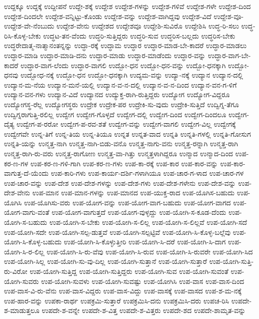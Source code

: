 {ಉದ್ದಕ್ಕೂ
ಉದ್ದಕ್ಕೆ
ಉದ್ದೀಪನೆ
ಉದ್ದೇ-ಶಕ್ಕೆ
ಉದ್ದೇಶ
ಉದ್ದೇಶ-ಗಳನ್ನು
ಉದ್ದೇಶ-ಗಳಿವೆ
ಉದ್ದೇಶ-ಗಳೇ
ಉದ್ದೇಶ-ದಿಂದ
ಉದ್ದೇಶ-ದಿಂದಲೇ
ಉದ್ದೇಶ-ವನ್ನಿಟ್ಟು-ಕೊಂಡು
ಉದ್ದೇಶ-ವನ್ನು
ಉದ್ದೇಶ-ವಾಗಿದ್ದವು
ಉದ್ದೇಶ-ವಿದೆ
ಉದ್ದೇಶ-ವೂ-
ಉದ್ದೇಶ-ವೇ-ನೆಂಬುದು
ಉದ್ದೇಶ-ವೇನು
ಉದ್ದೇಶದ
ಉದ್ದೇಶವೂ
ಉದ್ದೇಶಿ-ಸುವಿರೊ
ಉದ್ದೇಶಿಸಿ
ಉದ್ಧ-ರಿ-ಸಲು
ಉದ್ಧ-ರಿಸಿ-ಕೊಳ್ಳ-ಬೇಕು
ಉದ್ಧಟ-ತನ-ವೆಂದು
ಉದ್ಧರಿ-ಸುತ್ತಿದ್ದರು
ಉದ್ಧರಿ-ಸುವ
ಉದ್ಧರಿಸ-ಬಲ್ಲದು
ಉದ್ಧರಿಸ-ಬೇಕು
ಉದ್ಧರೇದಾತ್ಮ-ನಾತ್ಮಾನಂತನ್ನನ್ನು
ಉದ್ಧಾ-ರಕ್ಕೆ
ಉದ್ಧಾಮ
ಉದ್ಧಾರ
ಉದ್ಧಾರ-ಮಾಡ-ಬೇ-ಕಾದರೆ
ಉದ್ಧಾರ-ಮಾಡಲು
ಉದ್ಧಾರ-ಮಾಡಿ
ಉದ್ಧಾರ-ಮಾಡಿ-ದನು
ಉದ್ಧಾರ-ಮಾಡು
ಉದ್ಧಾರ-ಮಾಡೆಂದು
ಉದ್ಧಾರ-ವನ್ನು
ಉದ್ಧಾರ-ವಾಗ-ಬೇ-ಕಾದರೆ
ಉದ್ಧಾರ-ವಾಗ-ಲೆಂದು
ಉದ್ಧಾರ-ವಾಗಲಿ
ಉದ್ಬೋ-ಧನ
ಉದ್ಬೋ-ಧನ-ವನ್ನು
ಉದ್ಬೋ-ಧನಕ್ಕಾಗಿ
ಉದ್ಬೋ-ಧನವು
ಉದ್ಬೋಧ-ನಕ್ಕೆ
ಉದ್ಭೋ-ಧನ
ಉದ್ಭೋ-ಧನಕ್ಕಾಗಿ
ಉದ್ಯಮ-ವನ್ನು
ಉದ್ಯಾ-ನಕ್ಕೆ
ಉದ್ಯಾನ
ಉದ್ಯಾನ-ದಲ್ಲಿ
ಉದ್ಯಾನ-ಮ-ನೆಯ
ಉದ್ಯಾನ-ಮನೆ-ಯಲ್ಲಿ
ಉದ್ಯಾನ-ವ-ನ-ದಲ್ಲಿ
ಉದ್ಯಾನ-ವ-ನ-ದಿಂದ
ಉದ್ಯಾನ-ವನ-ಗ-ಳಿಗೆ
ಉದ್ಯಾನ-ವನ-ಗಳು
ಉದ್ಯಾನ-ವಿದೆ
ಉದ್ಯಾನದ
ಉದ್ಯುಕ್ತ-ರಾಗಿ-ರುತ್ತಿದ್ದರು
ಉದ್ಯೋಗ
ಉದ್ಯೋಗ-ವಿದ್ದರೂ
ಉದ್ಯೋಗಸ್ಥ-ರೆಲ್ಲ
ಉದ್ಯೋಗಸ್ಥರು
ಉದ್ರೇಕ
ಉದ್ರೇಕ-ಪರ
ಉದ್ರೇಕಿ-ಸು-ವುದು
ಉದ್ರೇಕಿ-ಸುತ್ತಿದೆ
ಉದ್ವಿಗ್ನ-ತೆಗೂ
ಉದ್ವಿಗ್ನರಾಗುತ್ತಿ-ರಲಿಲ್ಲ
ಉದ್ವೇಗ
ಉದ್ವೇಗ-ಗೊಳ್ಳದೆ
ಉದ್ವೇಗ-ದಲ್ಲಿ
ಉದ್ವೇಗ-ದಿಂದ
ಉದ್ವೇಗ-ದಿಂದಲೂ
ಉದ್ವೇಗ-ದೈತ್ಯ
ಉದ್ವೇಗ-ಪ-ರರೋ
ಉದ್ವೇಗ-ಪ-ರವ-ಶತೆ
ಉದ್ವೇಗ-ವನ್ನು
ಉದ್ವೇಗ-ವಾಗಲಿ
ಉದ್ವೇಗ-ವಿಲ್ಲ
ಉದ್ವೇಗಕ್ಕೆ
ಉದ್ವೇಗವೇ
ಉನ್ನ-ತಿಗೆ
ಉನ್ನ-ತಿಯ
ಉನ್ನ-ತಿಯೂ
ಉನ್ನತ
ಉನ್ನತ-ವಾದ
ಉನ್ನತಿ
ಉನ್ನತಿ-ಗಳಲ್ಲಿ
ಉನ್ನತಿ-ಗೋಸುಗ
ಉನ್ನತಿ-ಯನ್ನು
ಉನ್ಮತ್ತ-ನಾಗಿ
ಉನ್ಮತ್ತ-ನಾಗಿ-ಬಿಡು-ವನೊ
ಉನ್ಮತ್ತ-ನಾಗು-ವನು
ಉನ್ಮತ್ತ-ರನ್ನಾಗಿ
ಉನ್ಮತ್ತ-ರಾಗಿ
ಉನ್ಮತ್ತ-ರಾಗಿ-ರು-ವರು
ಉನ್ಮತ್ತ-ರಾಗೋಣ
ಉನ್ಮತ್ತ-ವಾ-ಗಿತ್ತು
ಉನ್ಮತ್ತಳಾಗಿದ್ದರೂ
ಉನ್ಮಾದ
ಉನ್ಮಾದ-ದಿಂದ
ಉಪ-ಕರ-ಣ-ಗಳ
ಉಪ-ಕರ-ಣ-ಗಳಿ-ಗಾಗಿ
ಉಪ-ಕರ-ಣ-ಗಳು
ಉಪ-ಕಾ-ರಕ್ಕೆ
ಉಪ-ಕಾರ
ಉಪ-ಕಾರ-ವನ್ನು
ಉಪ-ಕಾರ-ವಾಗುತ್ತ-ದೆ-ಯೆಂದು
ಉಪ-ಕಾರಿ-ಗಳು
ಉಪ-ಕಾರ್ಯ-ದರ್ಶಿ-ಗಳಾಗಿಯೂ
ಉಪ-ಚಾರ-ಗ-ಳಾದ
ಉಪ-ಚಾರ-ಗಳ
ಉಪ-ಚಾರ-ವನ್ನು
ಉಪ-ದೇಶ
ಉಪ-ದೇಶ-ಗಳನ್ನು
ಉಪ-ದೇಶ-ಗಳು
ಉಪ-ದೇಶ-ಗಳೇನು
ಉಪ-ದೇಶ-ವನ್ನು
ಉಪ-ದೇಶ-ವೇನು
ಉಪ-ಮಾನ
ಉಪ-ಮಾನ-ಗಳನ್ನು
ಉಪ-ಮಾನದ
ಉಪ-ಯುಕ್ತ-ರಾದ
ಉಪ-ಯೊಗಿಸ-ಬಹುದು
ಉಪ-ಯೊಗಿಸಿ
ಉಪ-ಯೊಗಿಸು-ವರು
ಉಪ-ಯೋಗ-ವನ್ನು
ಉಪ-ಯೋಗ-ವಾಗ-ಬಹುದು
ಉಪ-ಯೋಗ-ವಾಗದ
ಉಪ-ಯೋಗ-ವಾಗು-ವಂತೆ
ಉಪ-ಯೋಗ-ವಾಗುತ್ತದೆ
ಉಪ-ಯೋಗ-ವುಳ್ಳದ್ದು
ಉಪ-ಯೋಗಿ-ಸ-ಕೂಡ-ದೆಂದು
ಉಪ-ಯೋಗಿ-ಸ-ಬಹುದು
ಉಪ-ಯೋಗಿ-ಸ-ಬೇಕು
ಉಪ-ಯೋಗಿ-ಸ-ಲಿಲ್ಲ
ಉಪ-ಯೋಗಿ-ಸ-ಲಿಲ್ಲವೆ
ಉಪ-ಯೋಗಿ-ಸದೆ
ಉಪ-ಯೋಗಿ-ಸದೇ
ಉಪ-ಯೋಗಿ-ಸಲ್ಪ-ಡುತ್ತವೆ
ಉಪ-ಯೋಗಿ-ಸಲ್ಪಟ್ಟಿವೆ
ಉಪ-ಯೋಗಿ-ಸಿ-ಕೊಳ್ಳ-ಬಲ್ಲೆವು
ಉಪ-ಯೋಗಿ-ಸಿ-ಕೊಳ್ಳ-ಬಹುದು
ಉಪ-ಯೋಗಿ-ಸಿ-ಕೊಳ್ಳುತ್ತೀರಿ
ಉಪ-ಯೋಗಿ-ಸಿ-ದರೆ
ಉಪ-ಯೋಗಿ-ಸಿ-ದಾಗ
ಉಪ-ಯೋಗಿ-ಸಿ-ರ-ಲಿಲ್ಲ
ಉಪ-ಯೋಗಿ-ಸಿ-ರು-ವೆವು
ಉಪ-ಯೋಗಿ-ಸಿ-ರುವ
ಉಪ-ಯೋಗಿ-ಸಿ-ರುವರೇ
ಉಪ-ಯೋಗಿ-ಸಿದ
ಉಪ-ಯೋಗಿ-ಸಿಲ್ಲ
ಉಪ-ಯೋಗಿ-ಸು-ವು-ದಿಲ್ಲ
ಉಪ-ಯೋಗಿ-ಸುತ್ತಾನೆ
ಉಪ-ಯೋಗಿ-ಸುತ್ತಾರೆ
ಉಪ-ಯೋಗಿ-ಸುತ್ತಿ-ರು-ವಿರೋ
ಉಪ-ಯೋಗಿ-ಸುತ್ತಿದ್ದ
ಉಪ-ಯೋಗಿ-ಸುತ್ತಿದ್ದರು
ಉಪ-ಯೋಗಿ-ಸುವ
ಉಪ-ಯೋಗಿ-ಸುವಂತೆ
ಉಪ-ಯೋಗಿ-ಸುವರು
ಉಪ-ಯೋಗಿ-ಸುವಳು
ಉಪ-ಯೋಗಿ-ಸುವಷ್ಟು
ಉಪ-ಯೋಗಿಸಿ
ಉಪ-ವಾಸ
ಉಪ-ವಾಸ-ದಿಂದ
ಉಪ-ವಾಸ-ವಿ-ರು-ವೆನು
ಉಪ-ವಾಸ-ವಿದ್ದರು
ಉಪ-ವಾಸ-ವಿದ್ದು
ಉಪ-ವಾಸಕ್ಕೆ
ಉಪ-ವಾಸದ
ಉಪ-ಶ-ಮ-ನಕ್ಕೆ
ಉಪ-ಹಾರ-ವನ್ನು
ಉಪಕಾ-ರಾರ್ಥ
ಉಪಕ್ರಮಿ-ಸುತ್ತಾರೆ
ಉಪಕ್ರಮಿಸಿ-ದನು
ಉಪಕ್ರಮಿಸಿ-ದರು
ಉಪಚ-ರಿಸಿ
ಉಪದೇ-ಶ-ಮಾಡುತ್ತಲೂ
ಉಪದೇ-ಶ-ವನ್ನೇ
ಉಪದೇ-ಶ-ವಿತ್ತ
ಉಪದೇ-ಶ-ವಿತ್ತರು
ಉಪದೇ-ಶದ
ಉಪದೇ-ಶಾಮೃತ-ವನ್ನು
}
